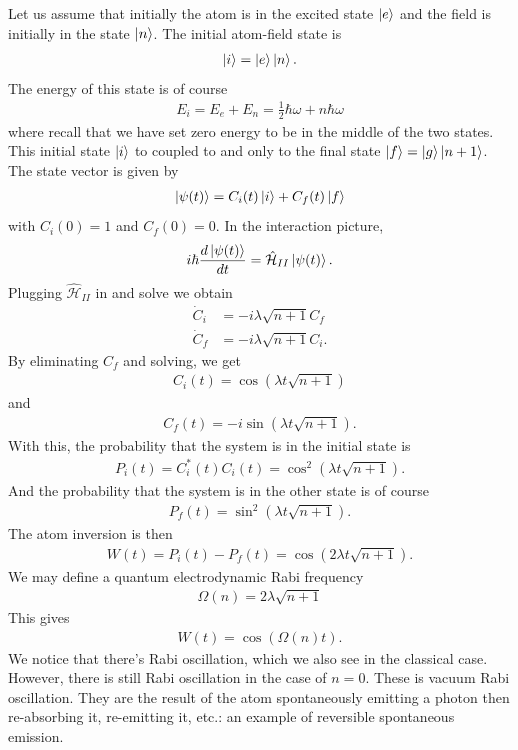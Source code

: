 \documentclass{book}
\theoremstyle{definition}
\newcommand{\ham}{\mathcal{H}}
\newcommand{\f}[2]{\frac{#1}{#2}}
\newcommand{\lp}{\left(}
\newcommand{\rp}{\right)}
\begin{document}
Let us assume that initially the atom is in the excited state $\ket{e}$ and the field is initially in the state $\ket{n}$. The initial atom-field state is
\begin{align}
\ket{i} = \ket{e}\ket{n}.
\end{align}
The energy of this state is of course
\begin{align}
E_i  = E_e + E_n = \f{1}{2}\hbar\omega + n\hbar\omega
\end{align}
where recall that we have set zero energy to be in the middle of the two states. This initial state $\ket{i}$ to coupled to and only to the final state $\ket{f} = \ket{g}\ket{n+1}$. The state vector is given by
\begin{align}
\ket{\psi(t)} = C_i(t) \ket{i} + C_f(t)\ket{f}
\end{align}
with $C_i(0) = 1$ and $C_f(0) = 0$. In the interaction picture, 
\begin{align}
i\hbar \f{d\ket{\psi(t)}}{dt} = \hat{\ham}_{II}\ket{\psi(t)}.
\end{align}
Plugging $\hat{\ham}_{II}$ in and solve we obtain
\begin{align}
\dot{C}_i &= -i\lambda \sqrt{n+1}C_f\\
\dot{C}_f &= -i\lambda \sqrt{n+1}C_i. 
\end{align}
By eliminating $C_f$ and solving, we get 
\begin{align}
C_i(t) = \cos\lp  \lambda t \sqrt{n+1} \rp
\end{align}
and 
\begin{align}
C_f(t) =-i\sin\lp \lambda t \sqrt{n+1} \rp.
\end{align}
With this, the probability that the system is in the initial state is
\begin{align}
P_i(t) = C_i^*(t)C_i(t) = \cos^2 \lp  \lambda t \sqrt{n+1} \rp.
\end{align}
And the probability that the system is in the other state is of course
\begin{align}
P_f(t) = \sin^2\lp  \lambda t \sqrt{n+1} \rp.
\end{align}
The atom inversion is then
\begin{align}
W(t) = P_i(t) - P_f(t) = \cos\lp 2\lambda t \sqrt{n+1} \rp.
\end{align}
We may define a quantum electrodynamic Rabi frequency
\begin{align}
\boxed{\Omega(n) = 2\lambda\sqrt{n+1}}
\end{align}
This gives
\begin{align}
W(t) = \cos\lp \Omega(n)t \rp.
\end{align}
We notice that there's Rabi oscillation, which we also see in the classical case. However, there is still Rabi oscillation in the case of $n=0$. These is vacuum Rabi oscillation. They are the result of the atom spontaneously emitting a photon then re-absorbing it, re-emitting it, etc.: an example of reversible spontaneous emission.
\end{document}
